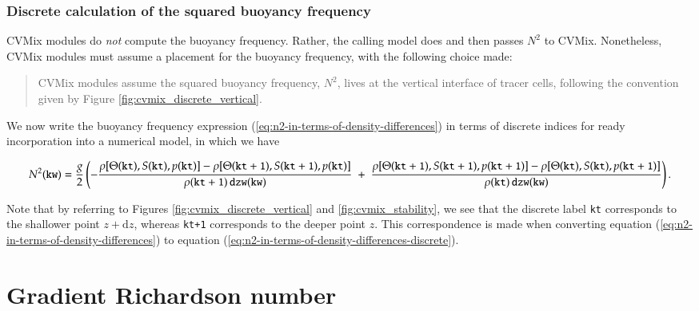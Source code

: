 \subsubsection{Discrete calculation of the squared buoyancy frequency}
\label{subsubsection:numerics-buoyancy-frequency}

CVMix modules do {\it not} compute the buoyancy frequency.  Rather,
the calling model does and then passes $N^{2}$ to CVMix. Nonetheless,
CVMix modules must assume a placement for the buoyancy frequency, with
the following choice made:
\begin{mdframed}[backgroundcolor=lightgray!50]
\begin{quote}
  {\sf CVMix modules assume the squared buoyancy frequency, $N^{2}$,
      lives at the vertical interface of tracer cells, following the
      convention given by Figure \ref{fig:cvmix_discrete_vertical}.}
\end{quote}
\end{mdframed}
We now write the buoyancy frequency expression
(\ref{eq:n2-in-terms-of-density-differences}) in terms of discrete
indices for ready incorporation into a numerical model, in which we have 
\small
\begin{mdframed}[backgroundcolor=lightgray!50]
\begin{equation}
N^{2}({\tt kw}) = 
 \frac{g}{2} 
  \left( 
 -\frac{
    \rho[ \Theta( {\tt kt}), S( {\tt kt}), p( {\tt kt})]
  -\rho[ \Theta( {\tt kt+1} ), S({\tt kt +1} ), p( {\tt kt} )]
  }{\rho({\tt kt+1} ) \,  {\tt dzw(kw)} }
 \; +  \; 
 \frac{ \rho[ \Theta({\tt kt+1}), S({\tt kt+1}), p({\tt kt+1})]-
 \rho[ \Theta({\tt kt} ), S( {\tt kt}), p({\tt kt+1})]
  }{\rho( {\tt kt}) \, {\tt dzw(kw)}  }
 \right).
\label{eq:n2-in-terms-of-density-differences-discrete}
\end{equation}
\end{mdframed}
\normalsize Note that by referring to Figures
\ref{fig:cvmix_discrete_vertical} and \ref{fig:cvmix_stability}, we
see that the discrete label {\tt kt} corresponds to the shallower
point $z+\mathrm{d}z$, whereas {\tt kt+1} corresponds to the deeper
point $z$.  This correspondence is made when converting equation
(\ref{eq:n2-in-terms-of-density-differences}) to
equation (\ref{eq:n2-in-terms-of-density-differences-discrete}).


\section{Gradient Richardson number}
\label{section:gradient-richardson-number-elements}


